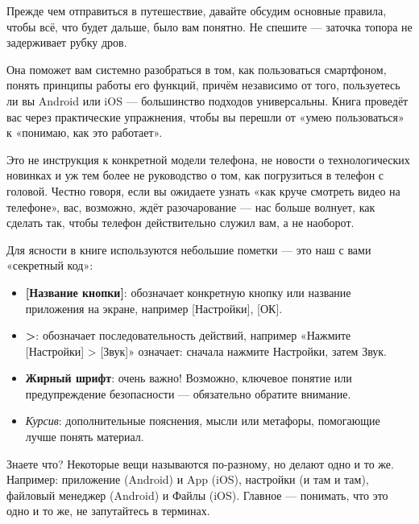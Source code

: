 
Прежде чем отправиться в путешествие, давайте обсудим основные правила, чтобы всё, что будет дальше, было вам понятно. Не спешите — заточка топора не задерживает рубку дров.


Она поможет вам системно разобраться в том, как пользоваться смартфоном, понять принципы работы его функций, причём независимо от того, пользуетесь ли вы Android или iOS — большинство подходов универсальны. Книга проведёт вас через практические упражнения, чтобы вы перешли от «умею пользоваться» к «понимаю, как это работает».

Это не инструкция к конкретной модели телефона, не новости о технологических новинках и уж тем более не руководство о том, как погрузиться в телефон с головой. Честно говоря, если вы ожидаете узнать «как круче смотреть видео на телефоне», вас, возможно, ждёт разочарование — нас больше волнует, как сделать так, чтобы телефон действительно служил вам, а не наоборот.


Для ясности в книге используются небольшие пометки — это наш с вами «секретный код»:

\begin{itemize}
  \item \textbf{[Название кнопки]}: обозначает конкретную кнопку или название приложения на экране, например [Настройки], [ОК].
  \item \textbf{>}: обозначает последовательность действий, например «Нажмите [Настройки] > [Звук]» означает: сначала нажмите Настройки, затем Звук.
  \item \textbf{Жирный шрифт}: очень важно! Возможно, ключевое понятие или предупреждение безопасности — обязательно обратите внимание.
  \item \emph{Курсив}: дополнительные пояснения, мысли или метафоры, помогающие лучше понять материал.
\end{itemize}


Знаете что? Некоторые вещи называются по-разному, но делают одно и то же. Например: приложение (Android) и App (iOS), настройки (и там и там), файловый менеджер (Android) и Файлы (iOS). Главное — понимать, что это одно и то же, не запутайтесь в терминах.

